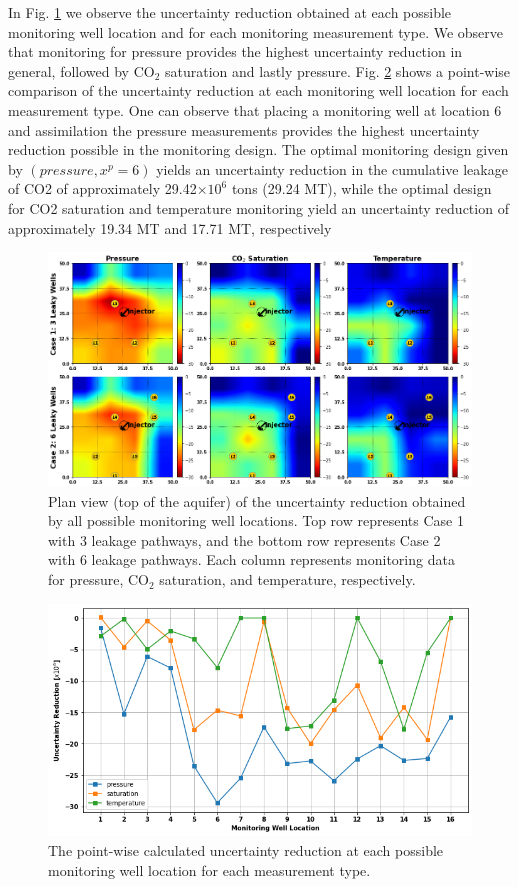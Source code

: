 \documentclass[10pt, twoside]{article}
\begin{document}
In Fig. \ref{heatmaps} we observe the uncertainty reduction obtained at each possible monitoring well location and for each monitoring measurement type. We observe that monitoring for pressure provides the highest uncertainty reduction in general, followed by CO$_2$ saturation and lastly pressure. Fig. \ref{point_ur} shows a point-wise comparison of the uncertainty reduction at each monitoring well location for each measurement type. One can observe that placing a monitoring well at location 6 and assimilation the pressure measurements provides the highest uncertainty reduction possible in the monitoring design. The optimal monitoring design given by $(pressure, x^p=6)$ yields an uncertainty reduction in the cumulative leakage of CO2 of approximately 29.42$\times 10^6$ tons (29.24 MT), while the optimal design for CO2 saturation and temperature monitoring yield an uncertainty reduction of approximately 19.34 MT and 17.71 MT, respectively

\begin{figure} [H]
\centering
\includegraphics[width=16 cm]{Figure 10.png}
\caption{Plan view (top of the aquifer) of the uncertainty reduction obtained by all possible monitoring well locations. Top row represents Case 1 with 3 leakage pathways, and the bottom row represents Case 2 with 6 leakage pathways. Each column represents monitoring data for pressure, CO$_2$ saturation, and temperature, respectively.}
\label{heatmaps}
\end{figure}

\begin{figure} [H]
\centering
\includegraphics[width=12 cm]{Figure 11.png}
\caption{The point-wise calculated uncertainty reduction at each possible monitoring well location for each measurement type.}
\label{point_ur}
\end{figure}
\end{document}
